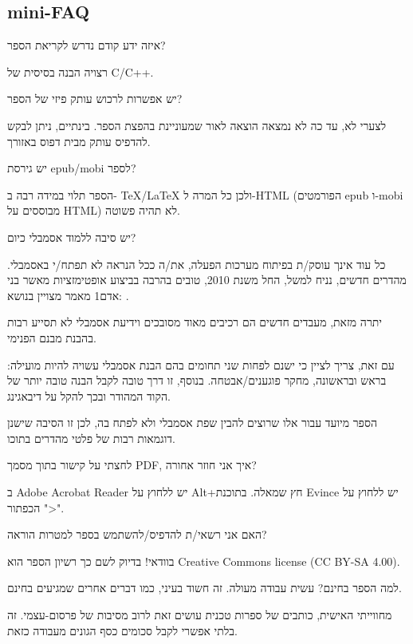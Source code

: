 \subsection*{mini-FAQ}


\par איזה ידע קודם נדרש לקריאת הספר?
\par רצויה הבנה בסיסית של C/C++.
\par יש אפשרות לרכוש עותק פיזי של הספר?
\par לצערי לא, עד כה לא נמצאה הוצאה לאור שמעוניינת בהפצת הספר. בינתיים, ניתן לבקש להדפיס עותק מבית דפוס באזורך.

\par יש גירסת epub/mobi לספר?
\par הספר תלוי במידה רבה ב- TeX/LaTeX ולכן כל המרה ל-HTML (הפורמטים epub ו-mobi מבוססים על HTML) לא תהיה פשוטה.

\par יש סיבה ללמוד אסמבלי כיום?
\par כל עוד אינך עוסק/ת בפיתוח מערכות הפעלה, את/ה ככל הנראה לא תפתח/י באסמבלי. מהדרים חדשים, נניח למשל, החל משנת 2010, טובים בהרבה בביצוע אופטימזציות מאשר בני אדם1 {מאמר מצויין בנושא: \InSqBrackets{\AgnerFog}}.

יתרה מזאת, מעבדים חדשים הם רכיבים מאוד מסובכים וידיעת אסמבלי לא תסייע רבות בהבנת מבנם הפנימי.

עם זאת, צריך לציין כי ישנם לפחות שני תחומים בהם הבנת אסמבלי עשויה להיות מועילה:
בראש ובראשונה, מחקר פוגענים/אבטחה. בנוסף, זו דרך טובה לקבל הבנה טובה יותר של הקוד המהודר ובכך להקל על דיבאגינג.

הספר מיועד עבור אלו שרוצים להבין שפת אסמבלי ולא לפתח בה, לכן זו הסיבה שישנן דוגמאות רבות של פלטי מהדרים בתוכו.

\par לחצתי על קישור בתוך מסמך PDF, איך אני חוזר אחורה?
\par ב Adobe Acrobat Reader יש ללחוץ על Alt+חץ שמאלה. בתוכנת Evince יש ללחוץ על הכפתור ">".

\par האם אני רשאי/ת להדפיס/להשתמש בספר למטרות הוראה?
\par בוודאי! בדיוק לשם כך רשיון הספר הוא Creative Commons license (CC BY-SA 4.00).

\par למה הספר בחינם? עשית עבודה מעולה. זה חשוד בעיני, כמו דברים אחרים שמגיעים בחינם.
\par מחווייתי האישית, כותבים של ספרות טכנית עושים זאת לרוב מסיבות של פרסום-עצמי. זה בלתי אפשרי לקבל סכומים כסף הגונים מעבודה כזאת.

